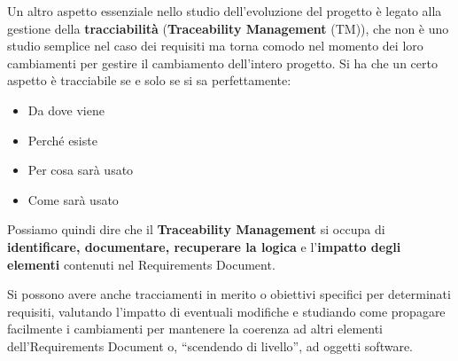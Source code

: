 Un altro aspetto essenziale nello studio dell'evoluzione del progetto è legato
alla gestione della \textbf{tracciabilità} (\textbf{Traceability Management}
(TM)), che non è uno studio semplice nel caso dei requisiti ma torna comodo nel
momento dei loro cambiamenti per gestire il cambiamento dell'intero progetto. Si
ha che un certo aspetto è tracciabile se e solo se si sa perfettamente:
\begin{itemize}
      \item Da dove viene
      \item Perché esiste
      \item Per cosa sarà usato
      \item Come sarà usato
\end{itemize}
Possiamo quindi dire che il \textbf{Traceability Management} si occupa di
\textbf{identificare, documentare, recuperare la logica} e l'\textbf{impatto
      degli elementi} contenuti nel Requirements Document.

Si possono avere anche tracciamenti in merito o obiettivi specifici per determinati
requisiti, valutando l'impatto di eventuali modifiche e studiando come propagare
facilmente i cambiamenti per mantenere la coerenza ad altri elementi
dell'Requirements Document o, “scendendo di livello”, ad oggetti software.

